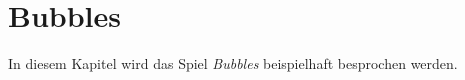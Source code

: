 \section{Bubbles}

In diesem Kapitel wird das Spiel \emph{Bubbles} beispielhaft besprochen werden. 
